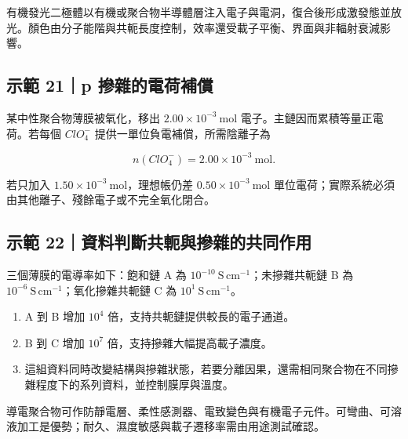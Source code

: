 \documentclass[11pt,a4paper]{article}
\providecommand{\tightlist}{%
  \setlength{\itemsep}{0pt}\setlength{\parskip}{0pt}}
\begin{document}
有機發光二極體以有機或聚合物半導體層注入電子與電洞，復合後形成激發態並放光。顏色由分子能階與共軛長度控制，效率還受載子平衡、界面與非輻射衰減影響。

\begin{HandoutWorkedExample}

\subsection{示範 21｜p 摻雜的電荷補償}\label{ux793aux7bc4-21p-ux647bux96dcux7684ux96fbux8377ux88dcux511f}

某中性聚合物薄膜被氧化，移出 \(2.00\times10^{-3}\ \mathrm{mol}\) 電子。主鏈因而累積等量正電荷。若每個 \(ClO_4^-\) 提供一單位負電補償，所需陰離子為

\[
n(ClO_4^-)=2.00\times10^{-3}\ \mathrm{mol}.
\]

若只加入 \(1.50\times10^{-3}\ \mathrm{mol}\)，理想帳仍差 \(0.50\times10^{-3}\ \mathrm{mol}\) 單位電荷；實際系統必須由其他離子、殘餘電子或不完全氧化閉合。

\end{HandoutWorkedExample}

\begin{HandoutWorkedExample}

\subsection{示範 22｜資料判斷共軛與摻雜的共同作用}\label{ux793aux7bc4-22ux8cc7ux6599ux5224ux65b7ux5171ux8edbux8207ux647bux96dcux7684ux5171ux540cux4f5cux7528}

三個薄膜的電導率如下：飽和鏈 A 為 \(10^{-10}\ \mathrm{S\,cm^{-1}}\)；未摻雜共軛鏈 B 為 \(10^{-6}\ \mathrm{S\,cm^{-1}}\)；氧化摻雜共軛鏈 C 為 \(10^{1}\ \mathrm{S\,cm^{-1}}\)。

\begin{enumerate}
\def\labelenumi{\arabic{enumi}.}
\tightlist
\item
  A 到 B 增加 \(10^4\) 倍，支持共軛鏈提供較長的電子通道。
\item
  B 到 C 增加 \(10^7\) 倍，支持摻雜大幅提高載子濃度。
\item
  這組資料同時改變結構與摻雜狀態，若要分離因果，還需相同聚合物在不同摻雜程度下的系列資料，並控制膜厚與溫度。
\end{enumerate}

\end{HandoutWorkedExample}

導電聚合物可作防靜電層、柔性感測器、電致變色與有機電子元件。可彎曲、可溶液加工是優勢；耐久、濕度敏感與載子遷移率需由用途測試確認。
\end{document}
